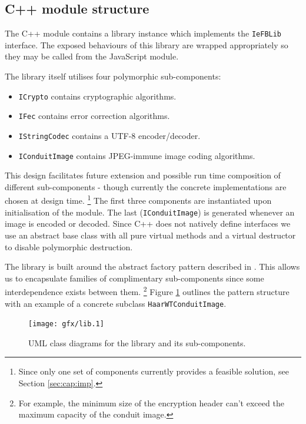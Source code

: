     

\subsection{C++ module structure}
\label{sec:modstruct}

    The C++ module contains a library instance which implements the {\tt IeFBLib} interface. The exposed behaviours of this library are wrapped appropriately so they may be called from the JavaScript module.
    
    The library itself utilises four polymorphic sub-components:
    
    \begin{itemize}
    
        \item {\tt ICrypto} contains cryptographic algorithms.
        \item {\tt IFec} contains error correction algorithms.
        \item {\tt IStringCodec} contains a UTF-8 encoder/decoder.
        \item {\tt IConduitImage} contains JPEG-immune image coding algorithms.
    
    \end{itemize}
    
    This design facilitates future extension and possible run time composition of different sub-components - though currently the concrete implementations are chosen at design time. \footnote{Since only one set of components currently provides a feasible solution, see Section \ref{sec:cap:imp}.} The first three components are instantiated upon initialisation of the module. The last ({\tt IConduitImage}) is generated whenever an image is encoded or decoded. Since C++ does not natively define interfaces we use an abstract base class with all pure virtual methods and a virtual destructor to disable polymorphic destruction.
    
    The library is built around the abstract factory pattern described in \cite{dpatterns}. This allows us to encapsulate families of complimentary sub-components since some interdependence exists between them. \footnote{For example, the minimum size of the encryption header can't exceed the maximum capacity of the conduit image.} Figure \ref{uml:lib-classes} outlines the pattern structure with an example of a concrete subclass {\tt HaarWTConduitImage}.
    
    \begin{figure}[tb]
        \begin{center}
                \texttt{[image: gfx/lib.1]}
            \caption{UML class diagrams for the library and its sub-components.}
            \label{uml:lib-classes}
        \end{center}
    \end{figure}
    
